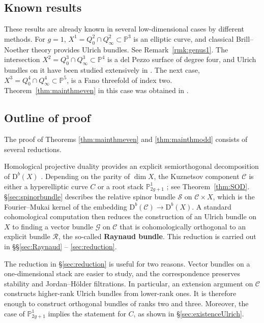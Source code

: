 \documentclass[12pt, letterpaper]{amsart}
\theoremstyle{definition}
\newcommand{\PP}{\mathbb{P} }
\newcommand{\cC}{\mathcal{C} }
\newcommand{\cG}{\mathcal{G} }
\newcommand{\cR}{\mathcal{R} }
\newcommand{\cS}{\mathcal{S} }
\newcommand{\rD}{\mathrm{D} }
\begin{document}
\subsection{Known results}

These results are already known in several low-dimensional cases by different methods. For \(g = 1\), \(X^1 = Q_0^2 \cap Q_\infty^2 \subset \PP^3\) is an elliptic curve, and classical Brill--Noether theory provides Ulrich bundles. See Remark~\ref{rmk:genus1}. The intersection \(X^2 = Q_0^3 \cap Q_\infty^3 \subset \PP^4\) is a del Pezzo surface of degree four, and Ulrich bundles on it have been studied extensively in \cite{CKM13, MRPL14}. The next case, \(X^3 = Q_0^4 \cap Q_\infty^4 \subset \PP^5\), is a Fano threefold of index two. Theorem~\ref{thm:mainthmeven} in this case was obtained in \cite{CKL21}.

\subsection{Outline of proof}

The proof of Theorems \ref{thm:mainthmeven} and \ref{thm:mainthmodd} consists of several reductions.

Homological projective duality provides an explicit semiorthogonal decomposition of \(\rD^b(X)\) \cite{Kuz07}. Depending on the parity of \(\dim X\), the Kuznetsov component \(\cC\) is either a hyperelliptic curve \(C\) or a root stack \(\PP_{2g+1}^1\) \cite{Kuz08}; see Theorem~\ref{thm:SOD}. \S\ref{sec:spinorbundle} describes the relative spinor bundle \(\cS\) on \(\cC \times X\), which is the Fourier--Mukai kernel of the embedding \(\rD^b(\cC) \to \rD^b(X)\). A standard cohomological computation then reduces the construction of an Ulrich bundle on \(X\) to finding a vector bundle \(\cG\) on \(\cC\) that is cohomologically orthogonal to an explicit bundle \(\cR\), the so-called \textbf{Raynaud bundle}. This reduction is carried out in \S\S\ref{sec:Raynaud} -- \ref{sec:reduction}.

The reduction in \S\ref{sec:reduction} is useful for two reasons. Vector bundles on a one-dimensional stack are easier to study, and the correspondence preserves stability and Jordan--H\"older filtrations. In particular, an extension argument on \(\cC\) constructs higher-rank Ulrich bundles from lower-rank ones. It is therefore enough to construct orthogonal bundles of ranks two and three. Moreover, the case of \(\PP_{2g+1}^1\) implies the statement for \(C\), as shown in \S\ref{sec:existenceUlrich}.
\end{document}
